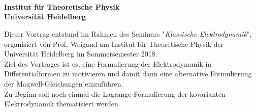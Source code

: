 \begin{center}

	\makeatletter
	\thispagestyle{plain}
	\LARGE\textbf{\@title} \\
	\vspace{2mm}
	\large\bfseries{\@author} \\
	\normalfont
	\vspace{2mm}
	\large{\@date} \\
	\vspace{2mm}
	\large{Institut für Theoretische Physik \\
		Universität Heidelberg} \\
	\makeatother
\end{center}

\normalsize

Dieser Vortrag entstand im Rahmen des Seminars "\textit{Klassische Elektrodynamik}", organisiert von Prof. Weigand am Institut für Theoretische Physik der Universität Heidelberg im Sommersemester 2018. \\
Ziel des Vortrages ist es, eine Formulierung der Elektrodynamik in Differentialformen zu motivieren und damit dann eine alternative Formulierung der Maxwell-Gleichungen einzuführen. \\
Zu Beginn soll noch einmal die Lagrange-Formulierung der kovarianten Elektrodynamik thematisiert werden.

